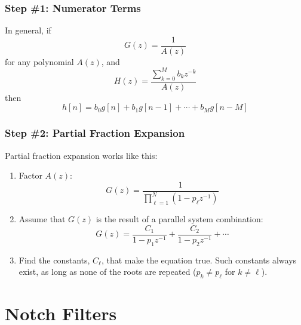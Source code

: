 \documentclass{beamer}
\begin{document}
\begin{frame}
  \frametitle{Step \#1: Numerator Terms}

  In general, if 
  \begin{displaymath}
    G(z) = \frac{1}{A(z)}
  \end{displaymath}
  for any polynomial $A(z)$, and
  \begin{displaymath}
    H(z) = \frac{\sum_{k=0}^M b_kz^{-k}}{A(z)}
  \end{displaymath}
  then
  \begin{displaymath}
    h[n] = b_0 g[n]+b_1g[n-1]+\cdots+b_M g[n-M]
  \end{displaymath}
\end{frame}

\begin{frame}
  \frametitle{Step \#2: Partial Fraction Expansion}
  Partial fraction expansion works like this:
  \begin{enumerate}
  \item Factor $A(z)$:
    \begin{displaymath}
      G(z) = \frac{1}{\prod_{\ell=1}^N \left(1-p_\ell z^{-1}\right)}
    \end{displaymath}
  \item Assume that $G(z)$ is the result of a parallel system
    combination:
    \begin{displaymath}
      G(z) = \frac{C_1}{1-p_1z^{-1}} + \frac{C_2}{1-p_2z^{-1}} + \cdots
    \end{displaymath}
  \item Find the constants, $C_\ell$, that make the equation true.
    Such constants always exist, as long as none of the roots are
    repeated ($p_k\ne p_\ell$ for $k\ne\ell$).
  \end{enumerate}
\end{frame}

\section[Notch]{Notch Filters}
\setcounter{subsection}{1}
\end{document}
